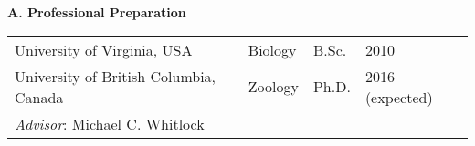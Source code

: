 \renewcommand{\thepage}{Biographical Sketch:  - Page \arabic{page} of 2}

\begin{comment}
Biographical Sketch [2 page limit]. Submit your CV in the section Biographical Sketches. Follow the
form in the Grants Program Guide II.C.2.f.i for senior personnel. List conference abstracts and titles of
presentations separately from peer--?reviewed articles. For unpublished manuscripts, list only those
submitted or accepted for publication (along with most likely date of publication).
\end{comment}





\setcounter{page}{1}
\renewcommand{\thepage}{Biographical Sketch - Page \arabic{page} of 2}


\textbf{A.  Professional Preparation}

\begin{tabular}{llll}
University of Virginia, USA \hspace{0.5in} & Biology \hspace{1in} & B.Sc.  \hspace{0.25in} & 2010 \\
University of British Columbia, Canada                     & Zoology              & Ph.D.                  & 2016 (expected) \\
\hspace{1cm} \emph{Advisor}: Michael C. Whitlock
\end{tabular}



